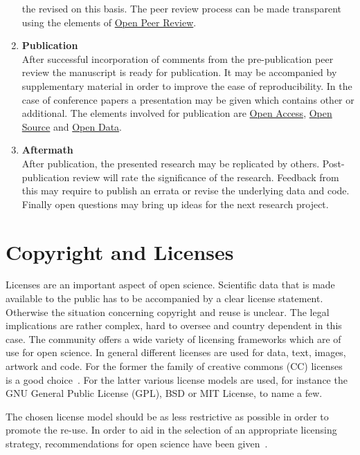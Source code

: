 \documentclass[a4paper, 10pt, twocolumn]{article}
\begin{document}
\begin{enumerate}
the revised on this basis. The peer review process can be made transparent using the elements of \underline{Open Peer Review}.
%
\item \textbf{Publication}\\
After successful incorporation of comments from the pre-publication peer review the manuscript is ready for
publication. It may be accompanied by supplementary material in order to improve the ease of reproducibility. In the
case of conference papers a presentation may be given which contains other or additional. The elements involved
for publication are \underline{Open Access}, \underline{Open Source} and \underline{Open Data}.
%
\item \textbf{Aftermath}\\
After publication, the presented research may be replicated by others. Post-publication
review will rate the significance of the research. Feedback from this
may require to publish an errata or revise the underlying data and code. Finally open questions
may bring up ideas for the next research project.
\end{enumerate}


\section*{Copyright and Licenses} \label{sec:copyright}

Licenses are an important aspect of open science. Scientific data that is made 
available to the public has to be accompanied by a clear license statement. Otherwise
the situation concerning copyright and reuse is unclear. The legal implications are
rather complex, hard to oversee and country dependent in this case. The community offers
a wide variety of licensing frameworks which are of use for open science. In general different 
licenses are used for data, text, images, artwork and code. For the former the family of 
creative commons (CC) licenses~\cite{CC} is a good choice~\cite{Kreuzer14:Book}. For the
latter various license models are used, for instance the GNU General Public License (GPL), 
BSD or MIT License, to name a few.

The chosen license model should be as less restrictive as possible in order to promote the
re-use. In order to aid in the selection of an appropriate licensing strategy, recommendations
for open science have been given~\cite{Stodden09:CSE,}.


\end{document}
